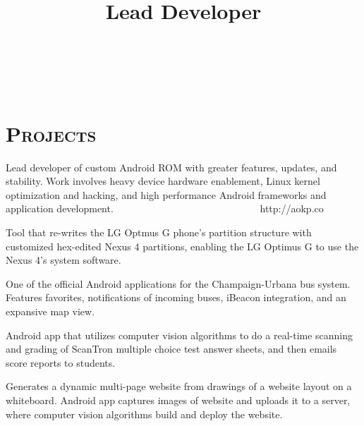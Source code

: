 \begin{resume}
\begin{formatb}
  \\
  \body\\
\end{formatb}

\section{\textsc{Projects}}

\title{Lead Developer}
\begin{position}
Lead developer of custom Android ROM with greater features, updates, and stability. Work involves heavy device hardware enablement, Linux kernel optimization and hacking, and high performance Android frameworks and application development. \ \ \ \ \ \ \ \ \ \ \ \ \ \ \ \ \ \ \ \ \ \ \ \ \ \ \ \ \ http://aokp.co
\end{position}

\begin{position}
Tool that re-writes the LG Optmus G phone's partition structure with customized hex-edited Nexus 4 partitions, enabling the LG Optimus G to use the Nexus 4's system software.
\end{position}

\begin{position}
One of the official Android applications for the Champaign-Urbana bus system. Features favorites, notifications of incoming buses, iBeacon integration, and an expansive map view.
\end{position}

\begin{position}
Android app that utilizes computer vision algorithms to do a real-time scanning and grading of ScanTron multiple choice test answer sheets, and then emails score reports to students.
\end{position}

\begin{position}
Generates a dynamic multi-page website from drawings of a website layout on a whiteboard. Android app captures images of website and uploads it to a server, where computer vision algorithms build and deploy the website.
\end{position}


\end{resume}
